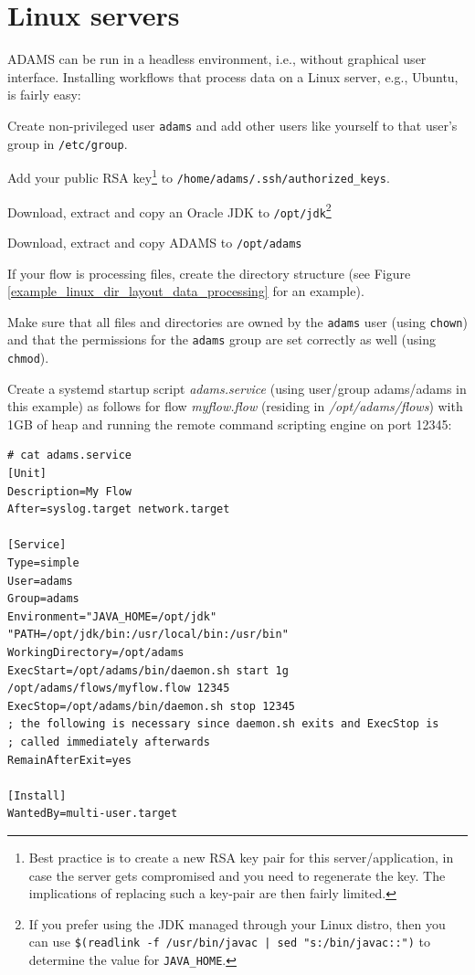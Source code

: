 \section{Linux servers}
ADAMS can be run in a headless environment, i.e., without graphical user
interface. Installing workflows that process data on a Linux server, e.g.,
Ubuntu, is fairly easy:
\begin{tight_itemize}
  \item Create non-privileged user \texttt{adams} and add other users like
  yourself to that user's group in \texttt{/etc/group}.
  \item Add your public RSA key\footnote{Best practice is to create a new
  RSA key pair for this server/application, in case the server gets compromised
  and you need to regenerate the key. The implications of replacing such a
  key-pair are then fairly limited.} to \texttt{/home/adams/.ssh/authorized\_keys}.
  \item Download, extract and copy an Oracle JDK to \texttt{/opt/jdk}\footnote{If you
  prefer using the JDK managed through your Linux distro, then you can use
  \texttt{\$(readlink -f /usr/bin/javac | sed "s:/bin/javac::")} to determine
  the value for \texttt{JAVA\_HOME}.}
  \item Download, extract and copy ADAMS to \texttt{/opt/adams}
  \item If your flow is processing files, create the directory structure
  (see Figure \ref{example_linux_dir_layout_data_processing} for an example).
  \item Make sure that all files and directories are owned by the \texttt{adams}
  user (using \texttt{chown}) and that the permissions for the \texttt{adams}
  group are set correctly as well (using \texttt{chmod}).
  \item Create a systemd startup script \textit{adams.service}
  (using user/group adams/adams in this example) as follows for flow
  \textit{myflow.flow} (residing in \textit{/opt/adams/flows}) with 1GB of
  heap and running the remote command scripting engine on port 12345:
    {\scriptsize \begin{verbatim}
# cat adams.service
[Unit]
Description=My Flow
After=syslog.target network.target

[Service]
Type=simple
User=adams
Group=adams
Environment="JAVA_HOME=/opt/jdk" "PATH=/opt/jdk/bin:/usr/local/bin:/usr/bin"
WorkingDirectory=/opt/adams
ExecStart=/opt/adams/bin/daemon.sh start 1g /opt/adams/flows/myflow.flow 12345
ExecStop=/opt/adams/bin/daemon.sh stop 12345
; the following is necessary since daemon.sh exits and ExecStop is
; called immediately afterwards
RemainAfterExit=yes

[Install]
WantedBy=multi-user.target
    \end{verbatim}}
\end{tight_itemize}

